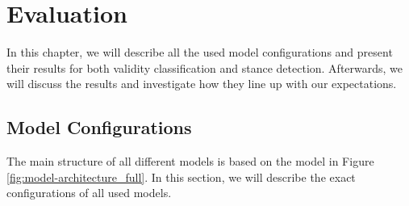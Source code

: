 \section{Evaluation}

In this chapter, we will describe all the used model configurations and present their results for both validity classification and stance detection. Afterwards, we will discuss the results and investigate how they line up with our expectations.

\subsection{Model Configurations}

The main structure of all different models is based on the model in Figure \ref{fig:model-architecture_full}. In this section, we will describe the exact configurations of all used models.


